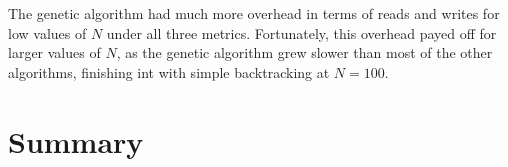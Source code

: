 \documentclass{article}
\begin{document}
		The genetic algorithm had much more overhead in terms of reads and writes for low values of $N$ under all three metrics. Fortunately, this overhead payed off for larger values of $N$, as the genetic algorithm grew slower than most of the other algorithms, finishing int with simple backtracking at $N=100$. 
	
\section{Summary}

	




	
	
	
\end{document}
